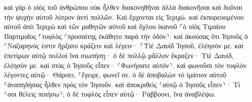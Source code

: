 \documentclass{openreader}
\begin{document}
καὶ γὰρ ὁ υἱὸς τοῦ ἀνθρώπου οὐκ ἦλθεν διακονηθῆναι ἀλλὰ διακονῆσαι καὶ δοῦναι τὴν ψυχὴν αὐτοῦ λύτρον ἀντὶ πολλῶν. 
Καὶ ἔρχονται εἰς Ἰεριχώ. καὶ ἐκπορευομένου αὐτοῦ ἀπὸ Ἰεριχὼ καὶ τῶν μαθητῶν αὐτοῦ καὶ ὄχλου ἱκανοῦ ⸀ὁ υἱὸς Τιμαίου Βαρτιμαῖος ⸀τυφλὸς ⸂προσαίτης ἐκάθητο παρὰ τὴν ὁδόν⸃. 
καὶ ἀκούσας ὅτι Ἰησοῦς ὁ ⸀Ναζαρηνός ἐστιν ἤρξατο κράζειν καὶ λέγειν· ⸀Υἱὲ Δαυὶδ Ἰησοῦ, ἐλέησόν με. 
καὶ ἐπετίμων αὐτῷ πολλοὶ ἵνα σιωπήσῃ· ὁ δὲ πολλῷ μᾶλλον ἔκραζεν· Υἱὲ Δαυίδ, ἐλέησόν με. 
καὶ στὰς ὁ Ἰησοῦς εἶπεν· ⸂Φωνήσατε αὐτόν⸃. καὶ φωνοῦσι τὸν τυφλὸν λέγοντες αὐτῷ· Θάρσει, ⸀ἔγειρε, φωνεῖ σε. 
ὁ δὲ ἀποβαλὼν τὸ ἱμάτιον αὐτοῦ ⸀ἀναπηδήσας ἦλθεν πρὸς τὸν Ἰησοῦν. 
καὶ ἀποκριθεὶς ⸂αὐτῷ ὁ Ἰησοῦς εἶπεν⸃· Τί ⸂σοι θέλεις ποιήσω⸃; ὁ δὲ τυφλὸς εἶπεν αὐτῷ· Ραββουνι, ἵνα ἀναβλέψω. 
\end{document}
